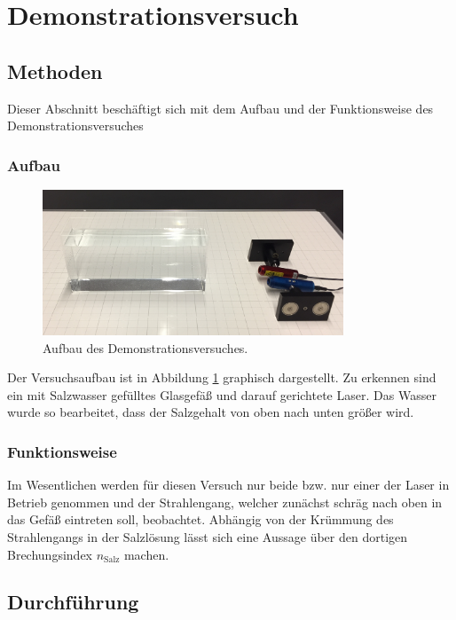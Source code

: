 \section{Demonstrationsversuch}
	
	\subsection{Methoden}
		
		Dieser Abschnitt beschäftigt sich mit dem Aufbau und der Funktionsweise des Demonstrationsversuches
	
		\subsubsection{Aufbau}
		
			\begin{figure}[ht]
				\centering
				\includegraphics[width=0.8\textwidth]{bilder/aufbau1.jpg}
				\caption{Aufbau des Demonstrationsversuches.\cite{WWU}}
				\label{fig:Aufbau1}	
			\end{figure}
			Der Versuchsaufbau ist in Abbildung \ref{fig:Aufbau1} graphisch dargestellt.
			Zu erkennen sind ein mit Salzwasser gefülltes Glasgefäß und darauf gerichtete Laser. 
			Das Wasser wurde so bearbeitet, dass der Salzgehalt von oben nach unten größer wird.
			
		\subsubsection{Funktionsweise}
			
			Im Wesentlichen werden für diesen Versuch nur beide bzw. nur einer der Laser in Betrieb genommen und der Strahlengang, welcher zunächst schräg nach oben in das Gefäß eintreten soll, beobachtet.
			Abhängig von der Krümmung des Strahlengangs in der Salzlösung lässt sich eine Aussage über den dortigen Brechungsindex $n_\text{Salz}$ machen.
			
	\subsection{Durchführung}
		
